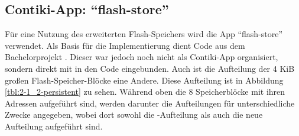 \subsection{Contiki-App: "`flash-store"'}

Für eine Nutzung des erweiterten Flash-Speichers wird die App "`flash-store"' verwendet. Als Basis für die Implementierung dient Code aus dem Bachelorprojekt
. Dieser war jedoch noch nicht als Contiki-App organisiert, sondern direkt mit in den Code eingebunden. Auch ist die Aufteilung der 4 KiB großen
Flash-Speicher-Blöcke eine Andere. Diese Aufteilung ist in Abbildung \ref{tbl:2-1_2-persistent} zu sehen. Während oben die 8 Speicherblöcke mit ihren Adressen
aufgeführt sind, werden darunter die Aufteilungen für unterschiedliche Zwecke angegeben, wobei dort sowohl die -Aufteilung als auch die neue
Aufteilung aufgeführt sind.

